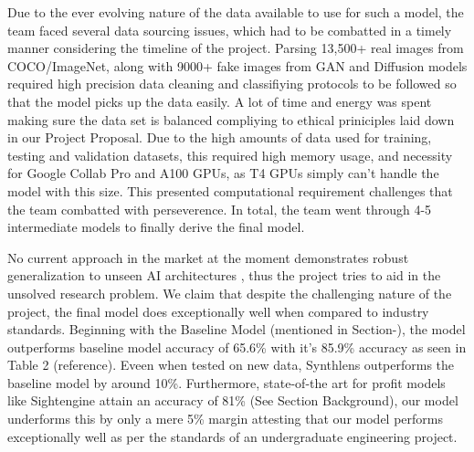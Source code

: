 \documentclass{article} %
\begin{document}
Due to the ever evolving nature of the data available to use for such a model, the team faced several data sourcing issues, which had to be combatted in a timely manner considering the timeline of the project. Parsing 13,500+ real images from COCO/ImageNet, along with 9000+ fake images from GAN and Diffusion models required high precision data cleaning and classifiying protocols to be followed so that the model picks up the data easily. A lot of time and energy was spent making sure the data set is balanced compliying to ethical priniciples laid down in our Project Proposal.
Due to the high amounts of data used for training, testing and validation datasets, this required high memory usage, and necessity for Google Collab Pro and A100 GPUs, as T4 GPUs simply can't handle the model with this size. This presented computational requirement challenges that the team combatted with perseverence.
In total, the team went through 4-5 intermediate models to finally derive the final model.

No current approach in the market at the moment demonstrates robust generalization to unseen AI architectures \citep{Mubarak2023}, thus the project tries to aid in the unsolved research problem. We claim that despite the challenging nature of the project, the final model does exceptionally well when compared to industry standards.
Beginning with the Baseline Model (mentioned in Section-), the model outperforms baseline model accuracy of 65.6\% with it's 85.9\% accuracy as seen in Table 2 (reference). Eveen when tested on new data, Synthlens outperforms the baseline model by around 10\%.
Furthermore, state-of-the art for profit models like Sightengine attain an accuracy of 81\% (See Section Background), our model underforms this by only a mere 5\% margin attesting that our model performs exceptionally well as per the standards of an undergraduate engineering project.

\label{last_page}



\end{document}
